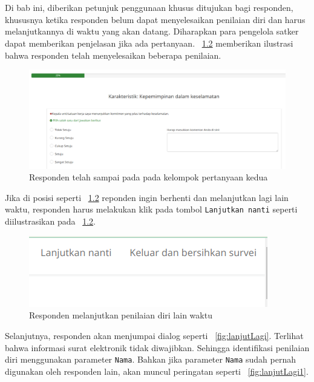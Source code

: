 \chapter{\babEmpat}
Di bab ini, diberikan petunjuk penggunaan khusus ditujukan bagi responden, khususnya ketika responden belum dapat menyelesaikan penilaian diri dan harus melanjutkannya di waktu yang akan datang. Diharapkan para pengelola satker dapat memberikan penjelasan jika ada pertanyaan. \figurename~\ref{fig:jeda} memberikan ilustrasi bahwa responden telah menyelesaikan beberapa penilaian.

\begin{figure}
  \begin{center}
    \includegraphics[scale=.35]{pics/masukLagi2.png}
    \caption{Responden telah sampai pada pada kelompok pertanyaan kedua}
    \label{fig:jeda}
  \end{center}
\end{figure}
 
Jika di posisi seperti \figurename~\ref{fig:jeda} reponden ingin berhenti dan melanjutkan lagi lain waktu, responden harus melakukan klik pada tombol \texttt{Lanjutkan nanti} seperti diilustrasikan pada \figurename~\ref{fig:jeda}.

\begin{figure}
  \begin{center}
    \includegraphics[scale=.5]{pics/masukLagi0.png}
    \caption{Responden melanjutkan penilaian diri lain waktu}
    \label{fig:jeda}
  \end{center}
\end{figure}
 
 
Selanjutnya, responden akan menjumpai dialog seperti \figurename~\ref{fig:lanjutLagi}. Terlihat bahwa informasi surat elektronik tidak diwajibkan. Sehingga identifikasi penilaian diri menggunakan parameter \texttt{Nama}. Bahkan jika parameter \texttt{Nama} sudah pernah digunakan oleh responden lain, akan muncul peringatan seperti \figurename~\ref{fig:lanjutLagi1}.

